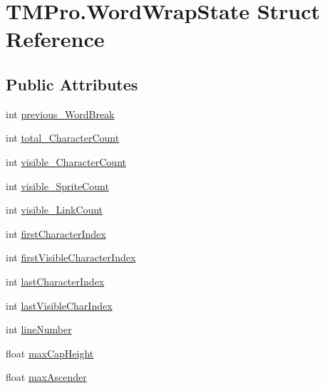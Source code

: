 \hypertarget{struct_t_m_pro_1_1_word_wrap_state}{}\section{T\+M\+Pro.\+Word\+Wrap\+State Struct Reference}
\label{struct_t_m_pro_1_1_word_wrap_state}
\subsection*{Public Attributes}
\begin{DoxyCompactItemize}
\item 
int \mbox{\hyperlink{struct_t_m_pro_1_1_word_wrap_state_a0c8a81dae06519293775b566c8d74aa1}{previous\+\_\+\+Word\+Break}}
\item 
int \mbox{\hyperlink{struct_t_m_pro_1_1_word_wrap_state_a5e233bdcb09242ca60058fb664637275}{total\+\_\+\+Character\+Count}}
\item 
int \mbox{\hyperlink{struct_t_m_pro_1_1_word_wrap_state_aa83c77430bb7e109c0efc58d3dc29f03}{visible\+\_\+\+Character\+Count}}
\item 
int \mbox{\hyperlink{struct_t_m_pro_1_1_word_wrap_state_a3a75181631548d2705bc91ecafd23cca}{visible\+\_\+\+Sprite\+Count}}
\item 
int \mbox{\hyperlink{struct_t_m_pro_1_1_word_wrap_state_a02ab5a3177607b31f85830e5a3789ffd}{visible\+\_\+\+Link\+Count}}
\item 
int \mbox{\hyperlink{struct_t_m_pro_1_1_word_wrap_state_a7336c9a67b4ebfb3a66972ae00a955e5}{first\+Character\+Index}}
\item 
int \mbox{\hyperlink{struct_t_m_pro_1_1_word_wrap_state_a87d9256de12f44b43a762ebfcddaf671}{first\+Visible\+Character\+Index}}
\item 
int \mbox{\hyperlink{struct_t_m_pro_1_1_word_wrap_state_a144f2ac537a755f68ccdee078d7a29ac}{last\+Character\+Index}}
\item 
int \mbox{\hyperlink{struct_t_m_pro_1_1_word_wrap_state_af7dbd80ac91b1aaf4e3ce902bb5f461c}{last\+Visible\+Char\+Index}}
\item 
int \mbox{\hyperlink{struct_t_m_pro_1_1_word_wrap_state_ae6742cdebc21a512335aa31c86162f50}{line\+Number}}
\item 
float \mbox{\hyperlink{struct_t_m_pro_1_1_word_wrap_state_a859060ddaaf30a9908d6acba69930864}{max\+Cap\+Height}}
\item 
float \mbox{\hyperlink{struct_t_m_pro_1_1_word_wrap_state_ae3d316b9669d236e4bef7e9c1494fbd3}{max\+Ascender}}
\item 

\end{DoxyCompactItemize}
